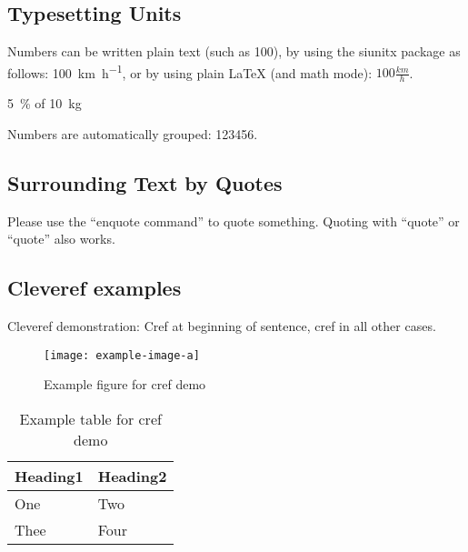 \documentclass[runningheads,a4paper,english]{llncs}[2022/01/12]
\begin{document}
\subsection{Typesetting Units}

\begin{ltgexample}
Numbers can be written plain text (such as 100), by using the siunitx package as follows:
\SI{100}{\km\per\hour},
or by using plain \LaTeX{} (and math mode):
$100 \frac{\mathit{km}}{h}$.
\end{ltgexample}

\begin{ltgexample}
\SI{5}{\percent} of \SI{10}{kg}
\end{ltgexample}

\begin{ltgexample}
Numbers are automatically grouped: \num{123456}.
\end{ltgexample}

\subsection{Surrounding Text by Quotes}

\begin{ltgexample}
Please use the \enquote{enquote command} to quote something.
Quoting with "`quote"' or ``quote'' also works.

\end{ltgexample}

\subsection{Cleveref examples}
\label{sec:ex:cref}

Cleveref demonstration: Cref at beginning of sentence, cref in all other cases.

\begin{figure}
    \centering
    \texttt{[image: example-image-a]}
    \caption{Example figure for cref demo}
    \label{fig:ex:cref}
\end{figure}

\begin{table}
    \centering
    \begin{tabular}{ll}
      \toprule
      Heading1 & Heading2 \\
      \midrule
      One      & Two      \\
      Thee     & Four     \\
      \bottomrule
    \end{tabular}
    \caption{Example table for cref demo}
    \label{tab:ex:cref}
\end{table}
\end{document}
